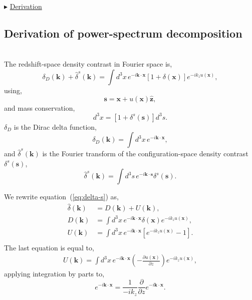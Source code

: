 \documentclass[a4paper,11pt, fleqn]{article}
\begin{document}
\vspace{10mm}
$\blacktriangleright$ \hyperlink{sec:decomposed-power-derivation}{Derivation}

%
\newpage
\subsection{Derivation of power-spectrum decomposition}
\label{sec:decomposed-power-derivation}\quad\\

The redshift-space density contrast in Fourier space is,
%
\begin{equation}
  \delta_D(\bm{k}) + \hat{\delta}^s(\bm{k}) = \int \! d^3 x \, e^{-i\bm{k}\cdot\bm{x}} [1 + \delta(\bm{x})] e^{-ik_z u(\bm{x})},
\end{equation}
%
using,
%
\begin{equation}
  \bm{s} = \bm{x} + u(\bm{x}) \hat{\bm{z}},
\end{equation}
%
and mass conservation,
%
\begin{equation}
  [1 + \delta(\bm{x})] d^3 x = [1 + \delta^s(\bm{s})] d^3 s.
\end{equation}
%
$\delta_D$ is the Dirac delta function,
%
\begin{equation}
  \delta_D(\bm{k}) = \int\! d^3 x \, e^{-i\bm{k}\cdot\bm{x}},
\end{equation}
and $\hat{\delta}^s(\bm{k})$ is the Fourier transform of the
configuration-space density contrast $\delta^s(\bm{s})$,
%
\begin{equation}
  \hat{\delta}^s(\bm{k}) = \int \! d^3 s \,
                           e^{-i\bm{k}\cdot\bm{s}} \delta^s(\bm{s}).
\end{equation}

\vspace{10mm}
We rewrite equation~(\ref{eq:delta-s}) as,
%
\begin{align}
  \hat{\delta}(\bm{k}) &= D(\bm{k}) + U(\bm{k}),\\
  D(\bm{k}) &= \int \! d^3 x \, e^{-i\bm{k}\cdot\bm{x}} \delta(\bm{x})
                                e^{-ik_z u(\bm{x})},\\
  \label{eq:U}
  U(\bm{k}) &= \int \! d^3 x \, e^{-i\bm{k}\cdot\bm{x}}
                              \left[ e^{-ik_z u(\bm{x})} - 1 \right].\\
\end{align}
%
The last equation is equal to,
%
\begin{equation}\begin{split}
  \label{eq:Uprime}
  U(\bm{k}) = \int\! d^3 x \, e^{-i \bm{k}\cdot\bm{x}}
              \left( - \frac{\partial u(\bm{x})}{\partial z} \right)
              e^{-ik_z u(\bm{x})},
\end{split}\end{equation}
applying integration by parts to,
\begin{equation}
  e^{-i \bm{k}\cdot\bm{x}} = \frac{1}{-ik_z}
  \frac{\partial}{\partial z} e^{-i \bm{k}\cdot\bm{x}}.
\end{equation}
\end{document}
